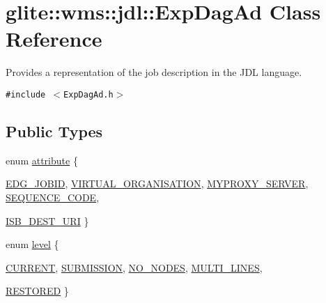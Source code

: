 \hypertarget{classglite_1_1wms_1_1jdl_1_1ExpDagAd}{
\section{glite::wms::jdl::Exp\-Dag\-Ad Class Reference}
\label{classglite_1_1wms_1_1jdl_1_1ExpDagAd}
}
Provides a representation of the job description in the JDL language.  


{\tt \#include $<$Exp\-Dag\-Ad.h$>$}

\subsection*{Public Types}
\begin{CompactItemize}
\item 
enum \hyperlink{classglite_1_1wms_1_1jdl_1_1ExpDagAd_w10}{attribute} \{ \par
\hyperlink{classglite_1_1wms_1_1jdl_1_1ExpDagAd_w10w0}{EDG\_\-JOBID}, 
\hyperlink{classglite_1_1wms_1_1jdl_1_1ExpDagAd_w10w1}{VIRTUAL\_\-ORGANISATION}, 
\hyperlink{classglite_1_1wms_1_1jdl_1_1ExpDagAd_w10w2}{MYPROXY\_\-SERVER}, 
\hyperlink{classglite_1_1wms_1_1jdl_1_1ExpDagAd_w10w3}{SEQUENCE\_\-CODE}, 
\par
\hyperlink{classglite_1_1wms_1_1jdl_1_1ExpDagAd_w10w4}{ISB\_\-DEST\_\-URI}
 \}
\item 
enum \hyperlink{classglite_1_1wms_1_1jdl_1_1ExpDagAd_w11}{level} \{ \par
\hyperlink{classglite_1_1wms_1_1jdl_1_1ExpDagAd_w11w5}{CURRENT}, 
\hyperlink{classglite_1_1wms_1_1jdl_1_1ExpDagAd_w11w6}{SUBMISSION}, 
\hyperlink{classglite_1_1wms_1_1jdl_1_1ExpDagAd_w11w7}{NO\_\-NODES}, 
\hyperlink{classglite_1_1wms_1_1jdl_1_1ExpDagAd_w11w8}{MULTI\_\-LINES}, 
\par
\hyperlink{classglite_1_1wms_1_1jdl_1_1ExpDagAd_w11w9}{RESTORED}
 \}
\end{CompactItemize}
